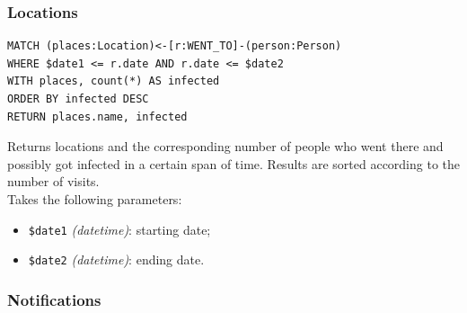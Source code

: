 \documentclass[12pt, a4paper]{article}
\begin{document}
\subsubsection{Locations}
\begin{tcolorbox}[fontupper=\scriptsize]
    \begin{verbatim}
MATCH (places:Location)<-[r:WENT_TO]-(person:Person)
WHERE $date1 <= r.date AND r.date <= $date2
WITH places, count(*) AS infected
ORDER BY infected DESC
RETURN places.name, infected
    \end{verbatim}
\end{tcolorbox}
\noindent %
Returns locations and the corresponding number of people who went there and possibly got infected in a certain span of time. Results are sorted according to the number of visits. \\
Takes the following parameters: 
\begin{itemize}
    \item \texttt{\$date1} \emph{(datetime)}: starting date;
    \item \texttt{\$date2} \emph{(datetime)}: ending date.
\end{itemize}

\subsubsection{Notifications}
\end{document}
